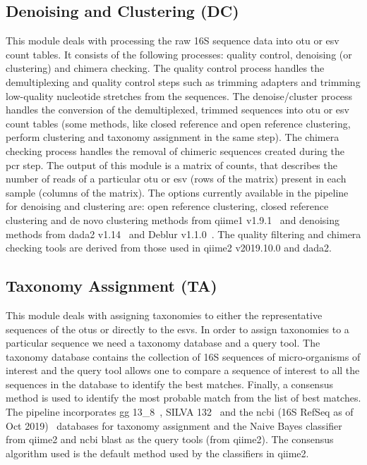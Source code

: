   \subsection*{Denoising and Clustering (DC)}
  \vspace{-5mm}
  This module deals with processing the raw 16S sequence data into \ac{otu} or \ac{esv} count tables.
  It consists of the following processes: quality control, denoising (or clustering) and chimera checking.
  The quality control process handles the demultiplexing and quality control steps such as trimming adapters and trimming low-quality nucleotide stretches from the sequences.
  The denoise/cluster process handles the conversion of the demultiplexed, trimmed sequences into \ac{otu} or \ac{esv} count tables (some methods, like closed reference and open reference clustering, perform clustering and taxonomy assignment in the same step).
  The chimera checking process handles the removal of chimeric sequences created during the \ac{pcr} step.
  The output of this module is a matrix of counts, that describes the number of reads of a particular \ac{otu} or \ac{esv} (rows of the matrix) present in each sample (columns of the matrix).
  The options currently available in the pipeline for denoising and clustering are: open reference clustering, closed reference clustering and de novo clustering methods from \ac{qiime1} v1.9.1~\cite{Caporaso2010} and denoising methods from \ac{dada2} v1.14~\cite{Callahan2016} and Deblur v1.1.0~\cite{Amir2017}.
  The quality filtering and chimera checking tools are derived from those used in \ac{qiime2} v2019.10.0 and \ac{dada2}.


  \subsection*{Taxonomy Assignment (TA)}
  \vspace{-5mm}
  This module deals with assigning taxonomies to either the representative sequences of the \ac{otu}s or directly to the \ac{esv}s.
  In order to assign taxonomies to a particular sequence we need a taxonomy database and a query tool.
  The taxonomy database contains the collection of 16S sequences of micro-organisms of interest and the query tool allows one to compare a sequence of interest to all the sequences in the database to identify the best matches.
  Finally, a consensus method is used to identify the most probable match from the list of best matches.
  The pipeline incorporates \ac{gg} 13\_8~\cite{DeSantis2006}, SILVA 132~\cite{Quast2012} and the \ac{ncbi} (16S RefSeq as of Oct 2019)~\cite{Sayers2009} databases for taxonomy assignment and the Naive Bayes classifier from \ac{qiime2} and \ac{ncbi} blast as the query tools (from \ac{qiime2}).
  The consensus algorithm used is the default method used by the classifiers in \ac{qiime2}.

